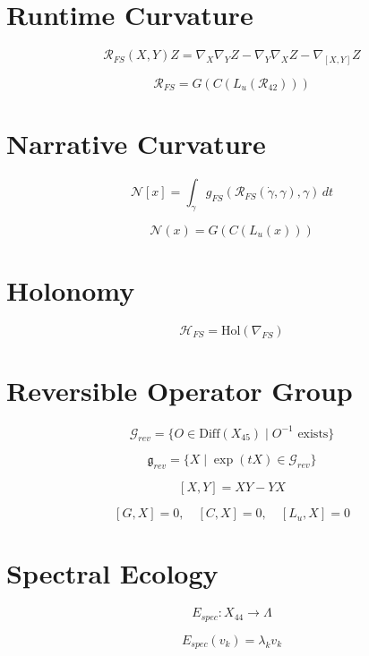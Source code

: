 \section*{Runtime Curvature}

\[
\mathcal{R}_{FS}(X,Y)Z
= \nabla_X \nabla_Y Z
- \nabla_Y \nabla_X Z
- \nabla_{[X,Y]} Z
\]

\[
\mathcal{R}_{FS}
= G(C(L_u(\mathcal{R}_{42})))
\]


\section*{Narrative Curvature}

\[
\mathcal{N}[x]
= \int_{\gamma}
g_{FS}(\mathcal{R}_{FS}(\dot{\gamma},\gamma), \gamma)\, dt
\]

\[
\mathcal{N}(x)
= G(C(L_u(x)))
\]


\section*{Holonomy}

\[
\mathcal{H}_{FS} = \mathrm{Hol}(\nabla_{FS})
\]


\section*{Reversible Operator Group}

\[
\mathcal{G}_{rev}
= \{ O \in \mathrm{Diff}(X_{45}) \mid O^{-1} \text{ exists} \}
\]

\[
\mathfrak{g}_{rev}
= \{ X \mid \exp(tX) \in \mathcal{G}_{rev} \}
\]

\[
[X,Y] = XY - YX
\]

\[
[G,X] = 0,\quad [C,X] = 0,\quad [L_u,X] = 0
\]


\section*{Spectral Ecology}

\[
E_{spec} : X_{44} \to \Lambda
\]

\[
E_{spec}(v_k) = \lambda_k v_k
\]

